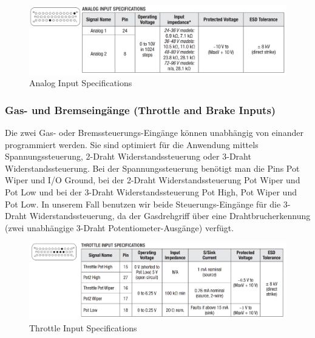 \begin{figure}[H]
	\begin{center}
		\includegraphics[scale=0.5]{figures/hcis/Analog_Input_Specifications.png}
		\caption{Analog Input Specifications}
	\end{center}
\end{figure}



\subsubsection{Gas- und Bremseingänge (Throttle and Brake Inputs)}
Die zwei Gas- oder Bremssteuerungs-Eingänge können unabhängig von einander programmiert werden. Sie sind optimiert für die Anwendung mittels Spannungssteuerung, 2-Draht Widerstandssteuerung oder 3-Draht Widerstandssteuerung. Bei der Spannungssteuerung benötigt man die Pins Pot Wiper und I/O Ground, bei der 2-Draht Widerstandssteuerung Pot Wiper und Pot Low und bei der 3-Draht Widerstandssteuerung Pot High, Pot Wiper und Pot Low. In unserem Fall benutzen wir beide Steuerungs-Eingänge für die 3-Draht Widerstandssteuerung, da der Gasdrehgriff über eine Drahtbrucherkennung (zwei unabhängige 3-Draht Potentiometer-Ausgänge) verfügt.

\begin{figure}[H]
	\begin{center}
		\includegraphics[scale=0.5]{figures/hcis/Throttle_Input_Specifications.png}
		\caption{Throttle Input Specifications}
	\end{center}
\end{figure}



